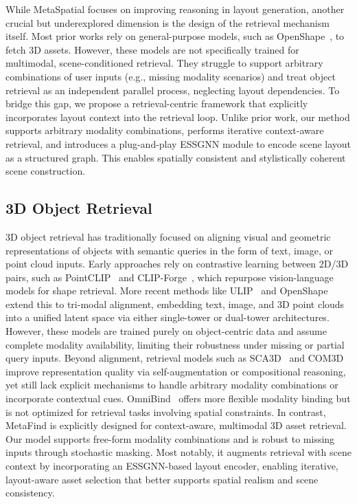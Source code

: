 While MetaSpatial focuses on improving reasoning in layout generation, another crucial but underexplored dimension is the design of the retrieval mechanism itself. Most prior works rely on general-purpose models, such as OpenShape~\cite{liu2023openshape}, to fetch 3D assets. However, these models are not specifically trained for multimodal, scene-conditioned retrieval. They struggle to support arbitrary combinations of user inputs (e.g., missing modality scenarios) and treat object retrieval as an independent parallel process, neglecting layout dependencies. To bridge this gap, we propose a retrieval-centric framework that explicitly incorporates layout context into the retrieval loop. Unlike prior work, our method supports arbitrary modality combinations, performs iterative context-aware retrieval, and introduces a plug-and-play ESSGNN module to encode scene layout as a structured graph. This enables spatially consistent and stylistically coherent scene construction.

\subsection{3D Object Retrieval}
3D object retrieval has traditionally focused on aligning visual and geometric representations of objects with semantic queries in the form of text, image, or point cloud inputs. Early approaches rely on contrastive learning between 2D/3D pairs, such as PointCLIP~\cite{zhang2022pointclip} and CLIP-Forge~\cite{sanghi2022clip}, which repurpose vision-language models for shape retrieval. More recent methods like ULIP~\cite{xue2024ulip} and OpenShape~\cite{liu2023openshape} extend this to tri-modal alignment, embedding text, image, and 3D point clouds into a unified latent space via either single-tower or dual-tower architectures. However, these models are trained purely on object-centric data and assume complete modality availability, limiting their robustness under missing or partial query inputs. Beyond alignment, retrieval models such as SCA3D~\cite{ren2025sca3d} and COM3D~\cite{wu2024com3d} improve representation quality via self-augmentation or compositional reasoning, yet still lack explicit mechanisms to handle arbitrary modality combinations or incorporate contextual cues. OmniBind~\cite{wang2024omnibindlargescaleomnimultimodal} offers more flexible modality binding but is not optimized for retrieval tasks involving spatial constraints. In contrast, MetaFind is explicitly designed for context-aware, multimodal 3D asset retrieval. Our model supports free-form modality combinations and is robust to missing inputs through stochastic masking. Most notably, it augments retrieval with scene context by incorporating an ESSGNN-based layout encoder, enabling iterative, layout-aware asset selection that better supports spatial realism and scene consistency.

